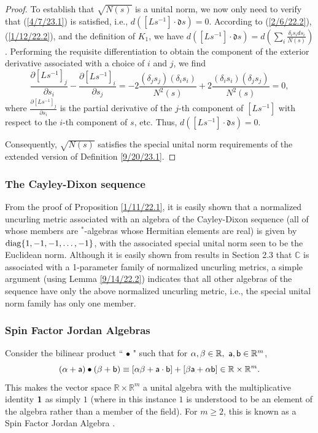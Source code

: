 \documentclass{amsart}
\numberwithin{equation}{section}
\theoremstyle{definition}
\numberwithin{theorem}{section}
\begin{document}
\begin{proof}
 To establish that $\sqrt{N(s)}$ is a unital norm, we  now only need to verify that (\ref{4/7/23.1}) is satisfied, i.e., $d\left([Ls^{-1}]\cdot \mathfrak{d}s\right)=0$.  According to (\ref{2/6/22.2}), (\ref{1/12/22.2}), and the definition  of $K_1$, we have $d\left([Ls^{-1}]\cdot \mathfrak{d}s\right) = d\left(\sum_i \frac{\delta_is_i ds_i}{N(s)}\right)$.  Performing the requisite differentiation to obtain the component of the exterior derivative associated with a choice of $i$ and $j$, we find \[ \frac{\partial [Ls^{-1}]_j}{\partial s_i} - \frac{\partial [Ls^{-1}]_i}{\partial s_j} = -2\frac{(\delta_j s_j)(\delta_i s_i)}{N^2(s)} +
2\frac{(\delta_i s_i)(\delta_j s_j)}{N^2(s)} = 0,  \] where $\frac{\partial [Ls^{-1}]_j}{\partial s_i}$ is the partial derivative of the $j$-th component of $[Ls^{-1}]$ with respect to the $i$-th component of $s$, etc. Thus,  $d\left([Ls^{-1}]\cdot \mathfrak{d}s\right) = 0$.

Consequently, $\sqrt{N(s)}$ satisfies the special unital norm requirements of the extended version of Definition \ref{9/20/23.1}.  
\end{proof}


\subsubsection{The Cayley-Dixon sequence}  From the proof of Proposition \ref{1/11/22.1}, it is easily shown that a normalized uncurling metric associated with an algebra of the Cayley-Dixon sequence (all of whose members are $^*$-algebras whose Hermitian elements are real) is given by ${\rm diag}\{1,-1,-1,\dots,-1\}$, with the associated special unital norm seen to be the Euclidean norm. Although it is easily shown from results in Section 2.3 that $\mathbb{C}$ is associated with a 1-parameter family of normalized uncurling metrics, a simple argument (using Lemma \ref{9/14/22.2}) indicates that all other algebras of the sequence have only the above normalized uncurling metric, i.e., the special unital norm family has only one member.  
 
\subsubsection{Spin Factor Jordan Algebras}  Consider the bilinear product ``$\,\bullet\,$" such that for
$\alpha,\beta\in \mathbb{R},\,\, {\sf a},{\sf b}\in \mathbb{R}^m$,  \begin{equation}  (\alpha+ {\sf a})\bullet (\beta + {\sf b}) \equiv
    [\alpha \beta + {\sf a} \cdot {\sf b}] + [ \beta {\sf a} + \alpha {\sf b}] \in \mathbb{R}\times \mathbb{R}^m. \label{12/24/18.1}\end{equation}  This makes the vector space $\mathbb{R}\times \mathbb{R}^m$ a unital algebra with the multiplicative identity ${\bf 1}$ as simply $1$ (where in this instance $1$ is understood to be an element of the algebra rather than a member of the field).  For $m\ge 2$, this is known as a Spin Factor Jordan Algebra \cite{mccrimmon:2004}.
\end{document}
